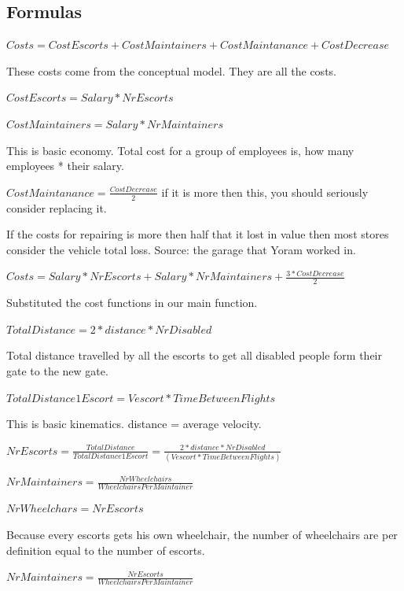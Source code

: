 \documentclass[a4paper, 12pt, notitlepage]{report}
\begin{document}
	\subsection{Formulas}
\begin{description}
	\item $Costs = CostEscorts + CostMaintainers + CostMaintanance + CostDecrease$
	\item[Explanation:] These costs come from the conceptual model. They are all the costs.
	\item $CostEscorts = Salary * NrEscorts$
	\item $CostMaintainers = Salary * NrMaintainers$
	\item[Explanation:] This is basic economy. Total cost for a group of employees is, how many employees * their salary.
	\item $CostMaintanance = \frac{CostDecrease}{2} $ if it is more then this, you should seriously consider replacing it.
	\item[Explanation:] If the costs for repairing is more then half that it lost in value then most stores consider the vehicle total loss. Source: the garage that Yoram worked in.
	\item
	\item $Costs = Salary * NrEscorts + Salary * NrMaintainers + \frac{3* CostDecrease}{2}$
	\item[Explanation:] Substituted the cost functions in our main function.
	\item $TotalDistance = 2*distance*NrDisabled$
	\item[Explanation:] Total distance travelled by all the escorts to get all disabled people form their gate to the new gate.
	\item $TotalDistance1Escort = Vescort*TimeBetweenFlights$
	\item[Explanation:] This is basic kinematics. distance = average velocity.
	\item $NrEscorts = \frac{TotalDistance}{TotalDistance1Escort} = \frac{2*distance*NrDisabled}{(Vescort*TimeBetweenFlights)}$
	\item
	\item $NrMaintainers = \frac{NrWheelchairs}{WheelchairsPerMaintainer}$
	\item $NrWheelchars = NrEscorts$
	\item[Explanation:] Because every escorts gets his own wheelchair, the number of wheelchairs are per definition equal to the number of escorts.
	\item $NrMaintainers = \frac{NrEscorts}{WheelchairsPerMaintainer}$

\end{description}
\end{document}
